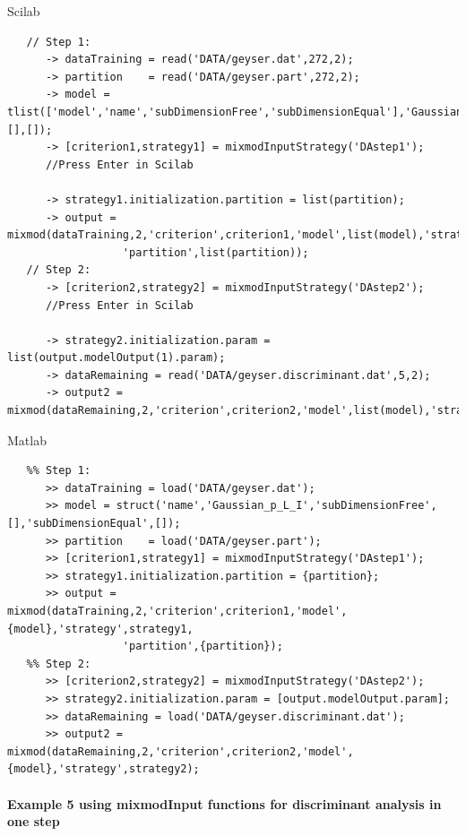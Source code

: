 Scilab
{\scriptsize
\begin{verbatim}
   // Step 1:
      -> dataTraining = read('DATA/geyser.dat',272,2);
      -> partition    = read('DATA/geyser.part',272,2);
      -> model = tlist(['model','name','subDimensionFree','subDimensionEqual'],'Gaussian_p_L_I',[],[]);
      -> [criterion1,strategy1] = mixmodInputStrategy('DAstep1');
      //Press Enter in Scilab

      -> strategy1.initialization.partition = list(partition);
      -> output = mixmod(dataTraining,2,'criterion',criterion1,'model',list(model),'strategy',strategy1,
                  'partition',list(partition));
   // Step 2:
      -> [criterion2,strategy2] = mixmodInputStrategy('DAstep2');
      //Press Enter in Scilab

      -> strategy2.initialization.param = list(output.modelOutput(1).param);
      -> dataRemaining = read('DATA/geyser.discriminant.dat',5,2);
      -> output2 = mixmod(dataRemaining,2,'criterion',criterion2,'model',list(model),'strategy',strategy2);

\end{verbatim}}



Matlab
{\scriptsize
\begin{verbatim}
   %% Step 1:
      >> dataTraining = load('DATA/geyser.dat');
      >> model = struct('name','Gaussian_p_L_I','subDimensionFree',[],'subDimensionEqual',[]);
      >> partition    = load('DATA/geyser.part');
      >> [criterion1,strategy1] = mixmodInputStrategy('DAstep1');
      >> strategy1.initialization.partition = {partition};
      >> output = mixmod(dataTraining,2,'criterion',criterion1,'model',{model},'strategy',strategy1,
                  'partition',{partition});
   %% Step 2:
      >> [criterion2,strategy2] = mixmodInputStrategy('DAstep2');
      >> strategy2.initialization.param = [output.modelOutput.param];
      >> dataRemaining = load('DATA/geyser.discriminant.dat');
      >> output2 = mixmod(dataRemaining,2,'criterion',criterion2,'model',{model},'strategy',strategy2);
\end{verbatim}}



\paragraph{ Example 5 using mixmodInput functions for discriminant analysis in one step\\}

